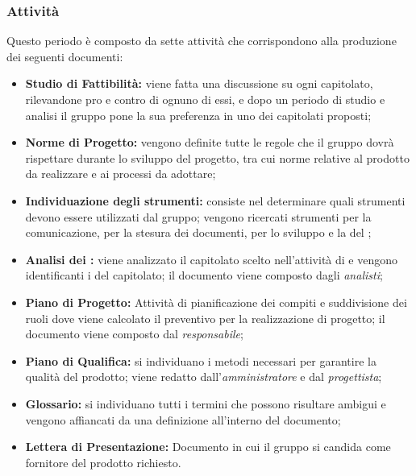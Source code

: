 \subsubsection{Attività}
Questo periodo è composto da sette attività che corrispondono alla produzione dei seguenti documenti:
\begin{itemize}
	\item \textbf{Studio di Fattibilità:} viene fatta una discussione su ogni capitolato, rilevandone pro e contro di ognuno di essi, e dopo un periodo di studio e analisi il gruppo pone la sua preferenza in uno dei capitolati proposti;
	\item \textbf{Norme di Progetto:} vengono definite tutte le regole che il gruppo dovrà rispettare durante lo sviluppo del progetto, tra cui norme relative al prodotto da realizzare e ai processi da adottare;
	\item \textbf{Individuazione degli strumenti:} consiste nel determinare quali strumenti devono essere utilizzati dal gruppo; vengono ricercati strumenti per la comunicazione, per la stesura dei documenti, per lo sviluppo e la  del ;
	\item \textbf{Analisi dei :} viene analizzato il capitolato scelto nell'attività di \SdF{} e vengono identificanti i  del capitolato; il documento viene composto dagli \textit{analisti};
	\item \textbf{Piano di Progetto:} Attività di pianificazione dei compiti e suddivisione dei ruoli dove viene calcolato il preventivo per la realizzazione di progetto; il documento viene composto dal \textit{responsabile};
	\item \textbf{Piano di Qualifica:} si individuano i metodi necessari per garantire la qualità del prodotto; viene redatto dall'\textit{amministratore} e dal \textit{progettista};
	\item\textbf{Glossario:} si individuano tutti i termini che possono risultare ambigui e vengono affiancati da una definizione all'interno del documento;  
	\item \textbf{Lettera di Presentazione:} Documento in cui il gruppo \Gruppo{} si candida come fornitore del prodotto  richiesto.
\end{itemize}

